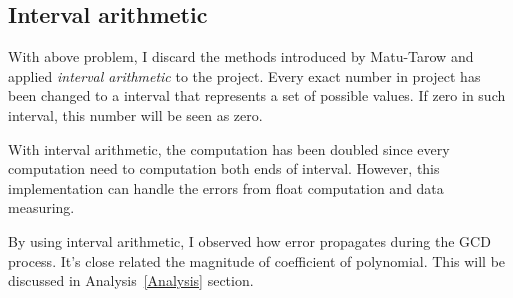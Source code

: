 \subsection{Interval arithmetic}

With above problem, I discard the methods introduced by
Matu-Tarow\cite{Approximate} and applied \textit{interval arithmetic} to the
project. Every exact number in project has been changed to a interval that
represents a set of possible values. If zero in such interval, this number will
be seen as zero.

With interval arithmetic, the computation has been doubled since every
computation need to computation both ends of interval. However, this
implementation can handle the errors from float computation and data measuring.

By using interval arithmetic, I observed how error propagates during the GCD
process. It's close related the magnitude of coefficient of polynomial. This
will be discussed in Analysis~\ref{Analysis} section. 

